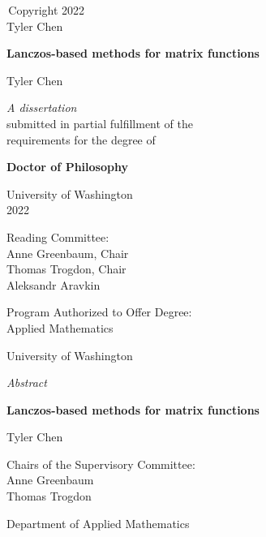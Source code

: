 \renewcommand{\thepage}{Copyright}
\begin{center}
\textcopyright\,Copyright 2022
\\
Tyler Chen
\thispagestyle{empty}
\end{center}


\clearpage
\renewcommand{\thepage}{UW title page}
\begin{center}

\textbf{Lanczos-based  methods for matrix functions}

\vspace{3em}
Tyler Chen 

\vfill

\textit{A dissertation}
\\
submitted in partial fulfillment of the
\\
requirements for the degree of

\vspace{3em}
\textbf{Doctor of Philosophy}

\vspace{3em}
University of Washington
\\
2022

\vspace{3em}
Reading Committee:
\\Anne Greenbaum, Chair
\\Thomas Trogdon, Chair
\\Aleksandr Aravkin

\vfill
Program Authorized to Offer Degree:
\\
Applied Mathematics

\end{center}

\thispagestyle{empty}

\clearpage
\renewcommand{\thepage}{UW abstract}
\begin{center}
University of Washington

\vspace{3em}
    \textit{Abstract}

\vspace{3em}
\textbf{Lanczos-based  methods for matrix functions}

\vspace{3em}
Tyler Chen

\vspace{3em}

Chairs of the Supervisory Committee:
\\Anne Greenbaum
\\Thomas Trogdon

\vspace{3em}
Department of Applied Mathematics

\end{center}


